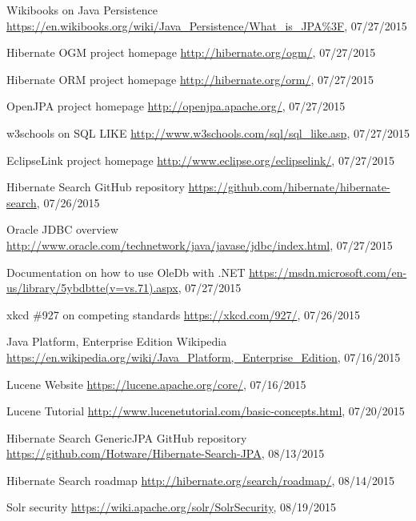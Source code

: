 \begin{thebibliography}{99}
	Wikibooks on Java Persistence
	\url{https://en.wikibooks.org/wiki/Java_Persistence/What_is_JPA\%3F}, 07/27/2015
	
	Hibernate OGM project homepage
	\url{http://hibernate.org/ogm/}, 07/27/2015
	
	Hibernate ORM project homepage
	\url{http://hibernate.org/orm/}, 07/27/2015
	
	OpenJPA project homepage
	\url{http://openjpa.apache.org/}, 07/27/2015
	
	w3schools on SQL LIKE
	\url{http://www.w3schools.com/sql/sql_like.asp}, 07/27/2015
	
	EclipseLink project homepage
	\url{http://www.eclipse.org/eclipselink/}, 07/27/2015
	
	Hibernate Search GitHub repository
	\url{https://github.com/hibernate/hibernate-search}, 07/26/2015
	
	Oracle JDBC overview
	\url{http://www.oracle.com/technetwork/java/javase/jdbc/index.html}, 07/27/2015
	
	Documentation on how to use OleDb with .NET
	\url{https://msdn.microsoft.com/en-us/library/5ybdbtte(v=vs.71).aspx}, 07/27/2015
	
	xkcd \#927 on competing standards
	\url{https://xkcd.com/927/}, 07/26/2015
	
	Java Platform, Enterprise Edition
	Wikipedia
	\url{https://en.wikipedia.org/wiki/Java_Platform,_Enterprise_Edition}, 07/16/2015
	
	Lucene Website
	\url{https://lucene.apache.org/core/}, 07/16/2015
	
	Lucene Tutorial
	\url{http://www.lucenetutorial.com/basic-concepts.html}, 07/20/2015
	
	Hibernate Search GenericJPA GitHub repository
	\url{https://github.com/Hotware/Hibernate-Search-JPA}, 08/13/2015
	
	Hibernate Search roadmap
	\url{http://hibernate.org/search/roadmap/}, 08/14/2015
	
	Solr security
	\url{https://wiki.apache.org/solr/SolrSecurity}, 08/19/2015
	

\end{thebibliography}
